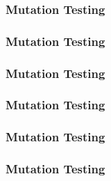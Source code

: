   \begin{frame}
    \frametitle{Mutation Testing}
    
    \begin{figure}[!htb]
    \centering
        \centering
        \vspace*{-3.5cm}
        {\fontsize{50}{50}}
    \end{figure}
    \end{frame}

  \begin{frame}
    \frametitle{Mutation Testing}
    
    \begin{figure}[!htb]
    \centering
        \vspace*{-2.15cm}
        {\fontsize{50}{50}}
        
    \end{figure}
    \end{frame}

  \begin{frame}
    \frametitle{Mutation Testing}
    \centering
    {\fontsize{60}{60}\selectfont{Silver Bullet?}}
  \end{frame}

  \begin{frame}
    \frametitle{Mutation Testing}
    \centering
    {\fontsize{50}{50}\selectfont{Limitations}}
  \end{frame}

  \begin{frame}
    \frametitle{Mutation Testing}
    \begin{figure}[!htb]
    \centering
    \small{}
    \end{figure}
    \end{frame}

  \begin{frame}
    \frametitle{Mutation Testing}
    \centering
    {\fontsize{50}{50}\selectfont{Still $\dots$}}
  \end{frame}

